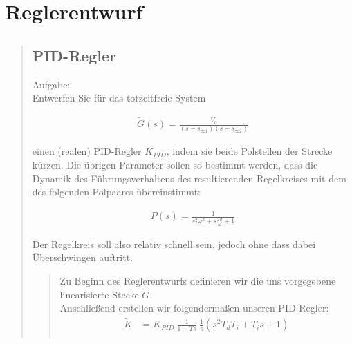 \section{Reglerentwurf}
\begin{quote}
	\hspace{-2em}
	\subsection{PID-Regler}
	\label{aufg:3.1}
	
	Aufgabe:\\
	Entwerfen Sie für das totzeitfreie System
	
	\begin{equation*}
    	\begin{split}
    		\tilde{G}(s) = \frac{V_0}{(s-s_{\infty 1})(s-s_{\infty 2})}
    	\end{split}
    \end{equation*}
	
	einen (realen) PID-Regler $K_{PID}$, indem sie beide Polstellen der Strecke kürzen. Die übrigen Parameter sollen so
	bestimmt werden, dass die Dynamik des Führungsverhaltens des resultierenden Regelkreises mit dem des folgenden Polpaares übereinstimmt:
	
	\begin{equation*}
    	\begin{split}
    		P(s) = \frac{1}{s^2 \omega^2 + s \frac{2 d}{\omega} + 1}
    	\end{split}
    \end{equation*}
	
	Der Regelkreis soll also relativ schnell sein, jedoch ohne dass dabei Überschwingen auftritt.\vspace{1em}
	
    \begin{quote}
        
        Zu Beginn des Reglerentwurfs definieren wir die uns vorgegebene linearisierte Stecke $\tilde{G}$.\\
        Anschließend erstellen wir folgendermaßen unseren PID-Regler:
        \begin{equation*}
        	\begin{split}
        		\tilde{K} &= K_{PID} \  \frac{1}{1 + T s} \ \frac{1}{s} (s^2  T_d T_i + T_i s + 1)\\
        	\end{split}
        \end{equation*}
        

\end{quote}
\end{quote}

